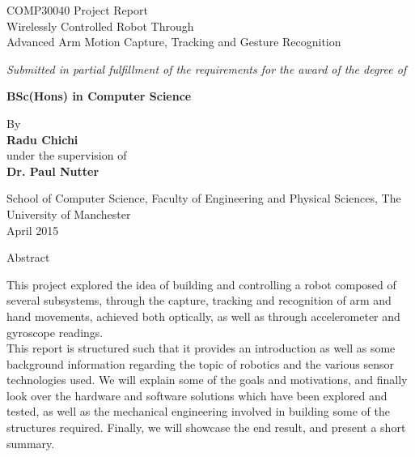 \documentclass[12p,a4paper]{report}
\title{}
\author{}
\begin{document}
\begin{center}
\Large COMP30040 Project Report \\ \vspace{10pt} \huge Wirelessly Controlled Robot Through  \\ Advanced Arm Motion Capture, Tracking and Gesture Recognition
\end{center}

\vspace{30pt}
\begin{center} \Large  \emph{Submitted in partial fulfillment of the requirements for the award of the degree of} \\ \vspace{10pt}

\textbf{\large BSc(Hons) in Computer Science}

\Large By \\ \vspace{5pt}
\textbf{Radu Chichi} \\ \vspace{5pt} under the supervision of \\ \vspace{5pt}
\textbf{Dr. Paul Nutter}
\end{center}

\vspace{150pt}
	
\begin{center} \Large
School of Computer Science, Faculty of Engineering and Physical Sciences, The University of Manchester \\ April 2015 
\end{center}

	\newpage
\vspace*{130pt}
\begin{center}
\Large Abstract
\end{center}

This project explored the idea of building and controlling a robot composed of several subsystems, through the capture, tracking and recognition of arm and hand movements, achieved both optically, as well as through accelerometer and gyroscope readings. \\

This report is structured such that it provides an introduction as well as some background information regarding the topic of robotics and the various sensor technologies used. We will explain some of the goals and motivations, and finally look over the hardware and software solutions which have been explored and tested, as well as the mechanical engineering involved in building some of the structures required. Finally, we will showcase the end result, and present a short summary.
\end{document}
